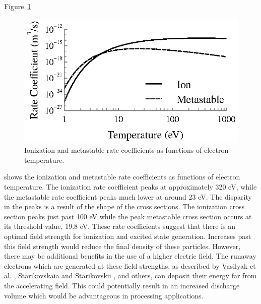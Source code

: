 Figure~\ref{fig:longrates}
\begin{figure}
  \centering
  \includegraphics{./chapters/modeling/figures/longrates.eps}
  \caption{Ionization and metastable rate coefficients as functions of
    electron temperature.}
  \label{fig:longrates}
\end{figure}
shows the ionization and metastable rate coefficients as functions of electron
temperature. The ionization rate coefficient peaks at approximately 320 eV,
while the metastable rate coefficient peaks much lower at around 23 eV. The
disparity in the peaks is a result of the shape of the cross sections. The
ionization cross section peaks just past 100 eV while the peak metastable cross
section occurs at its threshold value, 19.8 eV. These rate coefficients suggest
that there is an optimal field strength for ionization and excited state
generation. Increases past this field strength would reduce the final density of
these particles. However, there may be additional benefits in the use of a
higher electric field. The runaway electrons which are generated at these field
strengths, as described by Vasilyak et al. \cite{Vasilyak1994}, Starikovskaia
and Starikovskii \cite{Starikovskaia2001}, and others, can deposit their energy
far from the accelerating field. This could potentially result in an increased
discharge volume which would be advantageous in processing applications.

